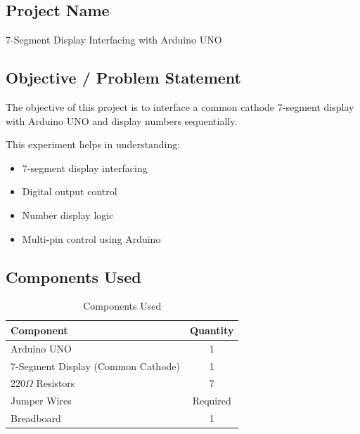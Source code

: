 
\subsection{Project Name}

7-Segment Display Interfacing with Arduino UNO


\subsection{Objective / Problem Statement}

The objective of this project is to interface a common cathode 7-segment display with Arduino UNO and display numbers sequentially.

This experiment helps in understanding:

\begin{itemize}
    \item 7-segment display interfacing
    \item Digital output control
    \item Number display logic
    \item Multi-pin control using Arduino
\end{itemize}


\subsection{Components Used}

\begin{table}[H]
\centering
\caption{Components Used}
\begin{tabular}{|l|c|}
\hline
\textbf{Component} & \textbf{Quantity}\\
\hline
Arduino UNO & 1\\
7-Segment Display (Common Cathode) & 1\\
220$\Omega$ Resistors & 7\\
Jumper Wires & Required\\
Breadboard & 1\\
\hline
\end{tabular}
\end{table}


